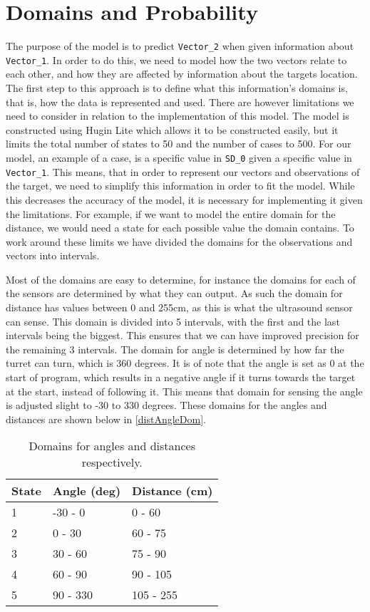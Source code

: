 \section{Domains and Probability}\label{MID}
The purpose of the model is to predict \texttt{Vector\_2} when given information
about \texttt{Vector\_1}. In order to do this, we need to model how the two
vectors relate to each other, and how they are affected by information about the
targets location. The first step to this approach is to define what this
information's domains is, that is, how the data is represented and used.
There are however limitations we need to consider in relation to the
implementation of this model. The model is constructed using Hugin Lite
\citep{Hugin} which allows it to be constructed easily, but it limits the total
number of states to 50 and the number of cases to 500. For our model, an example
of a case, is a specific value in \texttt{SD\_0} given a specific value in
\texttt{Vector\_1}. This means, that in order to represent our vectors and
observations of the target, we need to simplify this information in order to
fit the model. While this decreases the accuracy of the model, it is necessary
for implementing it given the limitations. For example, if we want to model the
entire domain for the distance, we would need a state for each possible value
the domain contains. To work around these limits we have divided the domains
for the observations and vectors into intervals.\nl

Most of the domains are easy to determine, for instance the domains for each of
the sensors are determined by what they can output. As such the domain for
distance has values between 0 and 255cm, as this is what the ultrasound sensor
can sense. This domain is divided into 5 intervals, with the first and the last
intervals being the biggest. This ensures that we can have improved precision
for the remaining 3 intervals. The domain for angle is determined by how far the
turret can turn, which is 360 degrees. It is of note that the angle is set as 0
at the start of program, which results in a negative angle if it turns towards the target at the
start, instead of following it. This means that domain for sensing the angle is
adjusted slight to -30 to 330 degrees. These domains for the angles and
distances are shown below in \autoref{distAngleDom}. 

\begin{table}[H]
\centering
\begin{tabular}{l|l|l}
State & Angle (deg) & Distance (cm) \\ \hline
1     & -30 - 0     & 0 - 60        \\
2     & 0 - 30      & 60 - 75       \\
3     & 30 - 60     & 75 - 90       \\
4     & 60 - 90     & 90 - 105      \\
5     & 90 - 330    & 105 - 255     
\end{tabular}
\caption{Domains for angles and distances respectively.}
\label{distAngleDom}
\end{table}

